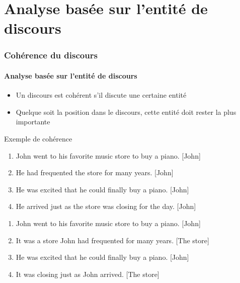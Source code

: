\documentclass[xcolor=table]{beamer}
\begin{document}
\section{Analyse basée sur l'entité de discours}

\begin{frame}
	\frametitle{Cohérence du discours}
	\framesubtitle{Analyse basée sur l'entité de discours}
	
	\begin{itemize}
		\item Un discours est cohérent s'il discute une certaine entité
		\item Quelque soit la position dans le discours, cette entité doit rester la plus importante
	\end{itemize}

	\begin{exampleblock}{Exemple de cohérence \cite{2019-jurafsky-martin}}
		\small
		\begin{minipage}{.48\textwidth}
			\begin{enumerate}
				\item John went to his favorite music store to buy a piano. [John]
				\item He had frequented the store for many years. [John]
				\item He was excited that he could finally buy a piano. [John]
				\item He arrived just as the store was closing for the day. [John]
			\end{enumerate}
		\end{minipage}
		\begin{minipage}{.48\textwidth}
			\begin{enumerate}
				\item John went to his favorite music store to buy a piano. [John]
				\item It was a store John had frequented for many years. [The store]
				\item He was excited that he could finally buy a piano. [John]
				\item It was closing just as John arrived. [The store]
			\end{enumerate}
		\end{minipage}
	\end{exampleblock}
	
\end{frame}
\end{document}
